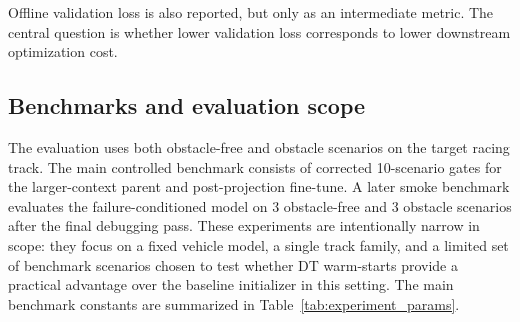 Offline validation loss is also reported, but only as an intermediate metric. The central question is whether lower validation loss corresponds to lower downstream optimization cost.

\subsection{Benchmarks and evaluation scope}

The evaluation uses both obstacle-free and obstacle scenarios on the target racing track. The main controlled benchmark consists of corrected 10-scenario gates for the larger-context parent and post-projection fine-tune. A later smoke benchmark evaluates the failure-conditioned model on 3 obstacle-free and 3 obstacle scenarios after the final debugging pass. These experiments are intentionally narrow in scope: they focus on a fixed vehicle model, a single track family, and a limited set of benchmark scenarios chosen to test whether DT warm-starts provide a practical advantage over the baseline initializer in this setting. The main benchmark constants are summarized in Table~\ref{tab:experiment_params}.

\begin{table}[h]
\centering
\caption{Main experiment parameters for the final Oval-track benchmark. Vehicle parameters come from the GTI model configuration used throughout the project.}
\label{tab:experiment_params}
\setlength{\tabcolsep}{4pt}
\small
{}
\end{table}
